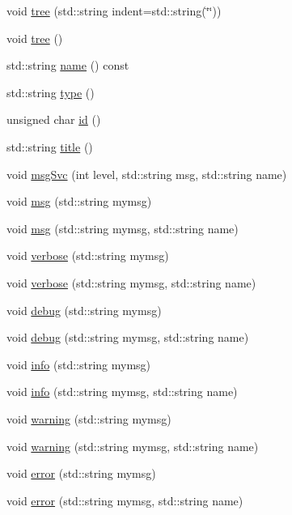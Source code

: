 \begin{DoxyCompactItemize}
void \hyperlink{classHierarchy_a76e914b9a677a22a82deb74d892bf261}{tree} (std::string indent=std::string(\char`\"{}\char`\"{}))
\item 
void \hyperlink{classHierarchy_a594c294c5f60c230e106d522ed008212}{tree} ()
\item 
std::string \hyperlink{classObject_a975e888d50bfcbffda2c86368332a5cd}{name} () const 
\item 
std::string \hyperlink{classObject_a84f99f70f144a83e1582d1d0f84e4e62}{type} ()
\item 
unsigned char \hyperlink{classObject_af99145335cc61ff6e2798ea17db009d2}{id} ()
\item 
std::string \hyperlink{classObject_a73a0f1a41828fdd8303dd662446fb6c3}{title} ()
\item 
void \hyperlink{classObject_a3f9d5537ebce0c0f2bf6ae4d92426f3c}{msgSvc} (int level, std::string msg, std::string name)
\item 
void \hyperlink{classObject_a58b2d0618c2d08cf2383012611528d97}{msg} (std::string mymsg)
\item 
void \hyperlink{classObject_ac5d59299273cee27aacf7de00d2e7034}{msg} (std::string mymsg, std::string name)
\item 
void \hyperlink{classObject_a83d2db2df682907ea1115ad721c1c4a1}{verbose} (std::string mymsg)
\item 
void \hyperlink{classObject_a2d4120195317e2a3c6532e8bb9f3da68}{verbose} (std::string mymsg, std::string name)
\item 
void \hyperlink{classObject_aac010553f022165573714b7014a15f0d}{debug} (std::string mymsg)
\item 
void \hyperlink{classObject_a6c9a0397ca804e04d675ed05683f5420}{debug} (std::string mymsg, std::string name)
\item 
void \hyperlink{classObject_a644fd329ea4cb85f54fa6846484b84a8}{info} (std::string mymsg)
\item 
void \hyperlink{classObject_a1ca123253dfd30fc28b156f521dcbdae}{info} (std::string mymsg, std::string name)
\item 
void \hyperlink{classObject_a65cd4fda577711660821fd2cd5a3b4c9}{warning} (std::string mymsg)
\item 
void \hyperlink{classObject_a11f101db4dd73d9391b0231818881d86}{warning} (std::string mymsg, std::string name)
\item 
void \hyperlink{classObject_a204a95f57818c0f811933917a30eff45}{error} (std::string mymsg)
\item 
void \hyperlink{classObject_ad7f6c457733082efa2f9ff5f5c8e119a}{error} (std::string mymsg, std::string name)

\end{DoxyCompactItemize}
